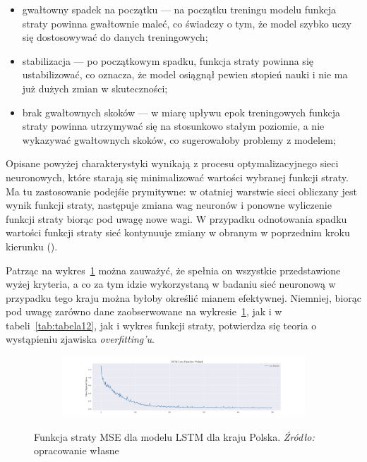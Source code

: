 \documentclass[polish, twoside, 12pt, a4paper]{article}
\theoremstyle{definition}
\theoremstyle{plain}
\theoremstyle{remark}
\begin{document}
\begin{itemize}[noitemsep]
	\item gwałtowny spadek na początku --- na początku treningu modelu funkcja straty powinna gwałtownie maleć, co świadczy o tym, że model szybko uczy się dostosowywać do danych treningowych;
	\item stabilizacja --- po początkowym spadku, funkcja straty powinna się ustabilizować, co oznacza, że model osiągnął pewien stopień nauki i nie ma już dużych zmian w skuteczności;
	\item brak gwałtownych skoków --- w miarę upływu epok treningowych funkcja straty powinna utrzymywać się na stosunkowo stałym poziomie, a nie wykazywać gwałtownych skoków, co sugerowałoby problemy z modelem;
\end{itemize}
Opisane powyżej charakterystyki wynikają z procesu optymalizacyjnego sieci neuronowych, które starają się minimalizować wartości wybranej funkcji straty. Ma tu zastosowanie podejśie prymitywne: w otatniej warstwie sieci obliczany jest wynik funkcji straty, następuje zmiana wag neuronów i ponowne wyliczenie funkcji straty biorąc pod uwagę nowe wagi. W przypadku odnotowania spadku wartości funkcji straty sieć kontynuuje zmiany w obranym w poprzednim kroku kierunku (\cite{brzezinski2021}). 

Patrząc na wykres~\ref{fig:x14} można zauważyć, że spełnia on wszystkie przedstawione wyżej kryteria, a co za tym idzie wykorzystaną w badaniu sieć neuronową w przypadku tego kraju można byłoby określić mianem efektywnej. Niemniej, biorąc pod uwagę zarówno dane zaobserwowane na wykresie~\ref{fig:x14}, jak i w tabeli~\ref{tab:tabela12}, jak i wykres funkcji straty, potwierdza się teoria o wystąpieniu zjawiska \textit{overfitting'u}. 

\begin{figure}[hbt]
  \centering

  \begin{subfigure}[t]{0.95\textwidth}
    \includegraphics[width=\textwidth]{./out_figures/lstm_loss_function_Poland.png}
  \end{subfigure}

  \captionsetup{margin=10pt,font=small,labelfont=bf,width=.8\textwidth}

  \caption[Funkcja straty MSE dla modelu LSTM dla kraju Polska.]{Funkcja straty MSE dla modelu LSTM dla kraju Polska. \textit{Źródło:} opracowanie własne}\label{fig:x14}
\end{figure}
\end{document}
